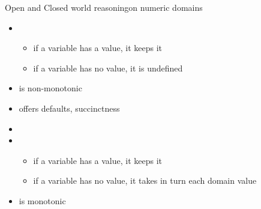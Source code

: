 \begin{frame}{Open and Closed world reasoning}{on numeric domains}
  \bigskip
  \begin{itemize}
  \item<1-> 
    \begin{itemize}
    \item if a variable has a value,  it keeps it
    \item if a variable has no value, it is undefined
    \end{itemize}
  \item<only@3->[] is non-monotonic
  \item<only@4->[] offers defaults, succinctness
  \item<only@1-3>[]
  \item<2-> 
    \begin{itemize}
    \item if a variable has a value,  it keeps it
    \item if a variable has no value, it takes in turn each domain value
    \end{itemize}
  \item<only@3->[] is monotonic
  \end{itemize}
\end{frame}
%
